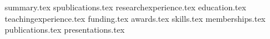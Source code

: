 \documentclass[11pt, a4paper]{awesome-cv}
\newcommand*{\sectiondir}{resume/}
\begin{document}
\makecvheader

{summary.tex}
{spublications.tex}
{researchexperience.tex}
{education.tex}
{teachingexperience.tex}
{funding.tex}
{awards.tex}
{skills.tex}
{memberships.tex}
{publications.tex}
{presentations.tex}
\end{document}
